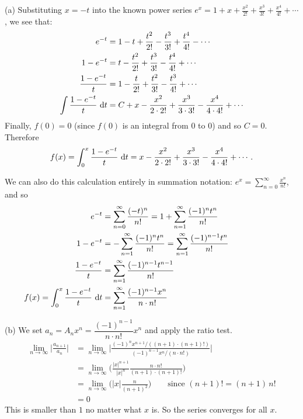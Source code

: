 \begin{solution} (a)
Substituting $x=-t$ into the known power series
$e^x = 1 + x +\frac{x^2}{2!}+\frac{x^3}{3!} + \frac{x^4}{4!} + \cdots$,
we see that:
\begin{align*}
e^{-t}&= 1  - t +\frac{t^2}{2!}-\frac{t^3}{3!} + \frac{t^4}{4!} - \cdots \\
1-e^{-t}&=  t - \frac{t^2}{2!}+ \frac{t^3}{3!} - \frac{t^4}{4!} + \cdots \\
\frac{1-e^{-t}}{t}&=  1 - \frac{t}{2!}+ \frac{t^2}{3!} - \frac{t^3}{4!} + \cdots \\
\int \frac{1-e^{-t}}{t}\ \mathrm{d}t&=  C + x - \frac{x^2}{2\cdot 2!}
                   + \frac{x^3}{3\cdot 3!} - \frac{x^4}{4\cdot 4!} + \cdots
\end{align*}
Finally, $f(0) = 0$ (since $f(0)$ is an integral from $0$ to $0$) and so $C=0$. Therefore
\begin{align*}
f(x) = \int_0^x\frac{1-e^{-t}}{t}\ \mathrm{d}t =  x - \frac{x^2}{2\cdot 2!} + \frac{x^3}{3\cdot 3!} - \frac{x^4}{4\cdot 4!} + \cdots.
\end{align*}

\medskip\noindent
We can also do this calculation entirely in summation notation:
$e^{x}= \displaystyle\sum\limits_{n=0}^\infty \frac{x^n}{n!}$, and so
\begin{align*}
e^{-t}&= \sum_{n=0}^\infty \frac{(-t)^n}{n!}
  =1+ \sum_{n=1}^\infty \frac{(-1)^nt^n}{n!} \\
1-e^{-t}&= - \sum_{n=1}^\infty \frac{(-1)^nt^n}{n!} = \sum_{n=1}^\infty \frac{(-1)^{n-1} t^n}{n!} \\
\frac{1-e^{-t}}{t}&= \sum_{n=1}^\infty \frac{(-1)^{n-1} t^{n-1}}{n!} \\
\hskip-90pt f(x) = \int_0^x\frac{1-e^{-t}}{t}\ \dee{t}
&= \sum_{n=1}^\infty \frac{(-1)^{n-1} x^n}{n\cdot n!}
\end{align*}

\noindent (b)
We set $a_n=A_nx^n = \dfrac{(-1)^{n-1}}{n\cdot n!} x^n$ and apply
the ratio test.
\begin{align*}
\lim_{n\rightarrow\infty}\Big|\frac{a_{n+1}}{a_n}\Big|
&=\lim_{n\rightarrow\infty}
   \bigg|\frac{{(-1)^{n}}x^{n+1}/{((n+1)\cdot (n+1)!)}}
                {{(-1)^{n-1}}x^n/{(n\cdot n!)}}\bigg| \\
&=\lim_{n\rightarrow\infty}
   \bigg( \frac{|x|^{n+1}}{|x|^n} \frac{n\cdot n!}{(n+1)\cdot (n+1)!} \bigg) \\
&=\lim_{n\rightarrow\infty}
      \bigg( |x|\frac{n}{(n+1)^2} \bigg)
\qquad\text{since $(n+1)!=(n+1)\,n!$}
\\
&=0
\end{align*}
This is smaller than $1$ no matter what $x$ is.
So the series converges for all $x$.


\end{solution}


